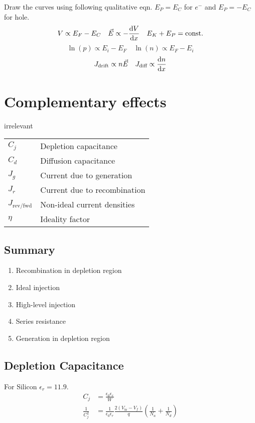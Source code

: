 \documentclass[a4paper, fontsize=8pt, landscape, DIV=1]{scrartcl}
\newcommand{\makeultracompact}{irrelevant}
\begin{document}
\begin{multicols*}{4}
    Draw the curves using following qualitative eqn. $E_P=E_C$ for $e^-$ and $E_P=-E_C$ for hole.
    \[ V \propto E_F - E_C \quad \vec{E} \propto -\frac{\mathrm{d}V}{\mathrm{d}x} \quad E_K + E_P = \text{const.} \]
    \[ \ln(p) \propto E_i-E_F \quad \ln(n) \propto E_F-E_i \]
    \[ J_{\text{drift}} \propto n\vec{E} \quad J_{\text{diff}} \propto \frac{\mathrm{d}n}{\mathrm{d}x} \]

    \section{Complementary effects}
  \ifdefined\makeultracompact
  \else
    \begin{tabular}[h]{l l}
      $C_j$   & Depletion capacitance \\
      $C_d$   & Diffusion capacitance \\
      $J_g$   & Current due to generation \\
      $J_r$   & Current due to recombination \\
      $J_{\text{rev/fwd}}$ & Non-ideal current densities \\
      $\eta$  & Ideality factor \\
    \end{tabular}
  \fi

    \subsection{Summary}
    \renewcommand{\labelenumi}{\alph{enumi})}
    \setlength{\fboxsep}{1pt}
    \begin{enumerate}[topsep=0pt,itemsep=-1ex,partopsep=1ex,parsep=1ex]
    \item \colorbox[rgb]{0.99,0.90,0.77}{Recombination in depletion region}
    \item \colorbox[rgb]{0.84,0.93,0.81}{Ideal injection}
    \item \colorbox[rgb]{0.75,0.85,0.99}{High-level injection}
    \item \colorbox[rgb]{0.89,0.75,0.93}{Series resistance}
    \item \colorbox[rgb]{0.98,0.79,0.78}{Generation in depletion region}
    \end{enumerate}

    
    \subsection{Depletion Capacitance}
    For Silicon $\epsilon_r = 11.9$.
    \begin{align*}
      C_j &= \frac{\epsilon_0\epsilon_r}{W} \\
      \frac{1}{C_j^2} &= \frac{1}{\epsilon_0\epsilon_r} \frac{2(V_{bi}-V_f)}{q} \left( \frac{1}{N_a} + \frac{1}{N_d}\right) \\
    \end{align*}


\end{multicols*}
\end{document}
